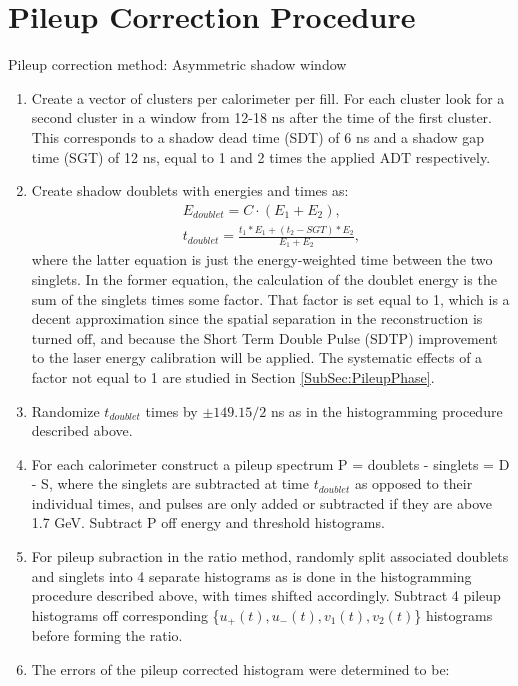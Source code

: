 \section{Pileup Correction Procedure}

Pileup correction method: Asymmetric shadow window

\begin{enumerate}
	\item{Create a vector of clusters per calorimeter per fill. For each cluster look for a second cluster in a window from 12-18 ns after the time of the first cluster. This corresponds to a shadow dead time (SDT) of 6 ns and a shadow gap time (SGT) of 12 ns, equal to 1 and 2 times the applied ADT respectively.}
	\item{Create shadow doublets with energies and times as:
		\begin{gather}
			E_{doublet} = C \cdot (E_{1} + E_{2}), \\
			t_{doublet} = \frac{t_{1}*E_{1} + (t_{2}-SGT)*E_{2}}{E_{1} + E_{2}},
		\end{gather}
	where the latter equation is just the energy-weighted time between the two singlets. In the former equation, the calculation of the doublet energy is the sum of the singlets times some factor. That factor is set equal to 1, which is a decent approximation since the spatial separation in the reconstruction is turned off, and because the Short Term Double Pulse (SDTP) improvement to the laser energy calibration will be applied. The systematic effects of a factor not equal to 1 are studied in Section \ref{SubSec:PileupPhase}.}
	\item{Randomize $t_{doublet}$ times by $\pm 149.15/2$ ns as in the histogramming procedure described above.}
	\item{For each calorimeter construct a pileup spectrum P = doublets - singlets = D - S, where the singlets are subtracted at time $t_{doublet}$ as opposed to their individual times, and pulses are only added or subtracted if they are above 1.7 GeV. Subtract P off energy and threshold histograms.}
	\item{For pileup subraction in the ratio method, randomly split associated doublets and singlets into 4 separate histograms as is done in the histogramming procedure described above, with times shifted accordingly. Subtract 4 pileup histograms off corresponding \{$u_{+}(t), u_{-}(t), v_{1}(t), v_{2}(t)$\} histograms before forming the ratio.}
	\item{The errors of the pileup corrected histogram were determined to be: 
}
\end{enumerate}
